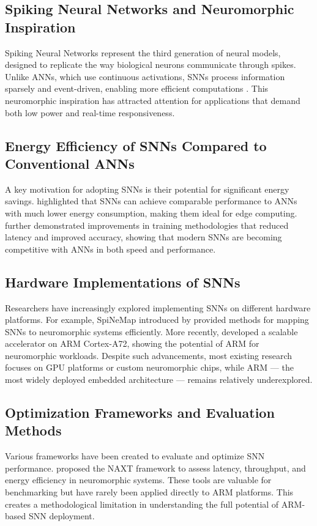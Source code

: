 \documentclass[a4paper,12pt]{article}
\begin{document}
	\subsection{Spiking Neural Networks and Neuromorphic Inspiration}
	Spiking Neural Networks represent the third generation of neural models, designed to replicate the way biological neurons communicate through spikes. Unlike ANNs, which use continuous activations, SNNs process information sparsely and event-driven, enabling more efficient computations \citep{Bouvier2019}. This neuromorphic inspiration has attracted attention for applications that demand both low power and real-time responsiveness.
	
	\subsection{Energy Efficiency of SNNs Compared to Conventional ANNs}
	A key motivation for adopting SNNs is their potential for significant energy savings. \citet{Yang2019} highlighted that SNNs can achieve comparable performance to ANNs with much lower energy consumption, making them ideal for edge computing. \citet{Bu2022} further demonstrated improvements in training methodologies that reduced latency and improved accuracy, showing that modern SNNs are becoming competitive with ANNs in both speed and performance.
	
	\subsection{Hardware Implementations of SNNs}
	Researchers have increasingly explored implementing SNNs on different hardware platforms. For example, SpiNeMap introduced by \citet{Balaji2019} provided methods for mapping SNNs to neuromorphic systems efficiently. More recently, \citet{Goma2023} developed a scalable accelerator on ARM Cortex-A72, showing the potential of ARM for neuromorphic workloads. Despite such advancements, most existing research focuses on GPU platforms or custom neuromorphic chips, while ARM — the most widely deployed embedded architecture — remains relatively underexplored.
	
	\subsection{Optimization Frameworks and Evaluation Methods}
	Various frameworks have been created to evaluate and optimize SNN performance. \citet{Abderrahmane2020} proposed the NAXT framework to assess latency, throughput, and energy efficiency in neuromorphic systems. These tools are valuable for benchmarking but have rarely been applied directly to ARM platforms. This creates a methodological limitation in understanding the full potential of ARM-based SNN deployment.
	
\end{document}
